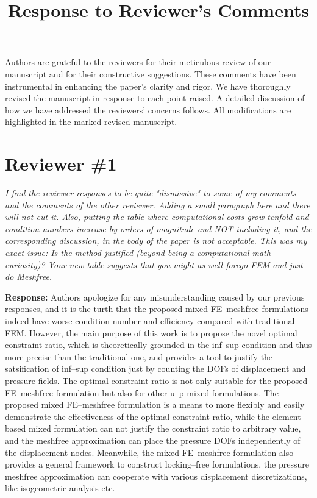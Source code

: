 \documentclass{article}
\title{Response to Reviewer's Comments}
\author{}
\date{}
\begin{document}
\maketitle
Authors are grateful to the reviewers for their meticulous review of our manuscript and for their constructive suggestions.
These comments have been instrumental in enhancing the paper's clarity and rigor.
We have thoroughly revised the manuscript in response to each point raised.
A detailed discussion of how we have addressed the reviewers' concerns follows.
All modifications are highlighted in the marked revised manuscript.

\section*{Reviewer \#1}
\textit{I find the reviewer responses to be quite "dismissive" to some of my comments and the comments of the other reviewer. Adding a small paragraph here and there will not cut it. Also, putting the table where computational costs grow tenfold and condition numbers increase by orders of magnitude and NOT including it, and the corresponding discussion, in the body of the paper is not acceptable. This was my exact issue: Is the method justified (beyond being a computational math curiosity)? Your new table suggests that you might as well forego FEM and just do Meshfree.}

\textbf{Response:} 
Authors apologize for any misunderstanding caused by our previous responses,
and it is the turth that the proposed mixed FE--meshfree formulations indeed have worse condition number and efficiency compared with traditional FEM.
However, the main purpose of this work is to propose the novel optimal constraint ratio, which is theoretically grounded in the inf--sup condition and thus more precise than the traditional one,
and provides a tool to justify the satsification of inf--sup condition just by counting the DOFs of displacement and pressure fields.
The optimal constraint ratio is not only suitable for the proposed FE--meshfree formulation but also for other u--p mixed formulations.
The proposed mixed FE--meshfree formulation is a means to more flexibly and easily demonstrate the effectiveness of the optimal constraint ratio,
while the element--based mixed formulation can not justify the constraint ratio to arbitrary value, and the meshfree approximation can place the pressure DOFs independently of the displacement nodes.
Meanwhile, the mixed FE--meshfree formulation also provides a general framework to construct locking--free formulations, the pressure meshfree approximation can cooperate with various displacement discretizations, like isogeometric analysis etc.
\end{document}
